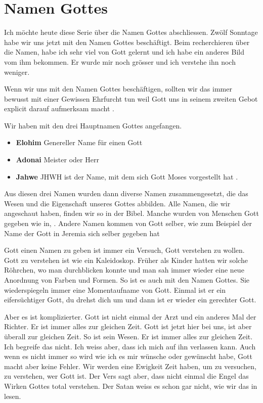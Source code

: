 \section{Namen Gottes}

Ich möchte heute diese Serie über die Namen Gottes abschliessen. Zwölf Sonntage habe wir uns jetzt mit den Namen Gottes beschäftigt. Beim recherchieren über die Namen, habe ich sehr viel von Gott gelernt und ich habe ein anderes Bild vom ihm bekommen. Er wurde mir noch grösser und ich verstehe ihn noch weniger.

Wenn wir uns mit den Namen Gottes beschäftigen, sollten wir das immer bewusst mit einer Gewissen Ehrfurcht tun weil Gott uns in seinem zweiten Gebot explicit darauf aufmerksam macht .

Wir haben mit den drei Hauptnamen Gottes angefangen.
\begin{itemize}
    \item \textbf{Elohim} Genereller Name für einen Gott
    \item \textbf{Adonai} Meister oder Herr
    \item \textbf{Jahwe} JHWH ist der Name, mit dem sich Gott Moses vorgestellt hat . 
\end{itemize}

Aus diesen drei Namen wurden dann diverse Namen zusammengesetzt, die das Wesen und die Eigenschaft unseres Gottes abbilden. Alle Namen, die wir angeschaut haben, finden wir so in der Bibel. Manche wurden von Menschen Gott gegeben wie in, . Andere Namen kommen von Gott selber, wie zum Beispiel der Name  der Gott in Jeremia sich selber gegeben hat

Gott einen Namen zu geben ist immer ein Versuch, Gott verstehen zu wollen. Gott zu verstehen ist wie ein Kaleidoskop. Früher als Kinder hatten wir solche Röhrchen, wo man durchblicken konnte und man sah immer wieder eine neue Anordnung von Farben und Formen. So ist es auch mit den Namen Gottes. Sie wiederspiegeln immer eine Momentaufname von Gott. Einmal ist er ein eifersüchtiger Gott, du drehst dich um und dann ist er wieder ein gerechter Gott. 

Aber es ist komplizierter. Gott ist nicht einmal der Arzt und ein anderes Mal der Richter. Er ist immer alles zur gleichen Zeit. Gott ist jetzt hier bei uns, ist aber überall zur gleichen Zeit. So ist sein Wesen. Er ist immer alles zur gleichen Zeit. Ich begreife das nicht. Ich weiss aber, dass ich mich auf ihn verlassen kann. Auch wenn es nicht immer so wird wie ich es mir wünsche oder gewünscht habe, Gott macht aber keine Fehler. Wir werden eine Ewigkeit Zeit haben, um zu versuchen, zu verstehen, wer Gott ist. Der Vers  sagt aber, dass nicht einmal die Engel das Wirken Gottes total verstehen. Der Satan weiss es schon gar nicht, wie wir das in  lesen.

